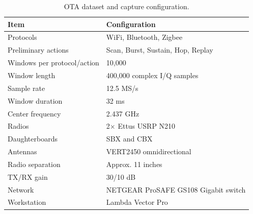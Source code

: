 \begin{table}[t]
\centering
\caption{OTA dataset and capture configuration.}
\label{tab:dataset_setup}
\begin{tabular}{ll}
\hline
\textbf{Item} & \textbf{Configuration} \\
\hline
Protocols & WiFi, Bluetooth, Zigbee \\
Preliminary actions & Scan, Burst, Sustain, Hop, Replay \\
Windows per protocol/action & 10,000 \\
Window length & 400,000 complex I/Q samples \\
Sample rate & 12.5 MS/s \\
Window duration & 32 ms \\
Center frequency & 2.437 GHz \\
Radios & 2$\times$ Ettus USRP N210 \\
Daughterboards & SBX and CBX \\
Antennas & VERT2450 omnidirectional \\
Radio separation & Approx. 11 inches \\
TX/RX gain & 30/10 dB \\
Network & NETGEAR ProSAFE GS108 Gigabit switch \\
Workstation & Lambda Vector Pro \\
\hline
\end{tabular}
\end{table}
